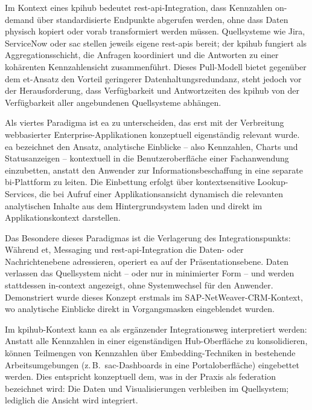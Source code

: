 Im Kontext eines \gls{kpihub} bedeutet \gls{rest}-\gls{api}-Integration, dass Kennzahlen on-demand über standardisierte Endpunkte abgerufen werden, ohne dass Daten physisch kopiert oder vorab transformiert werden müssen.
Quellsysteme wie Jira, ServiceNow oder \gls{sac} stellen jeweils eigene \gls{rest}-\glspl{api} bereit; der \gls{kpihub} fungiert als Aggregationsschicht, die Anfragen koordiniert und die Antworten zu einer kohärenten Kennzahlensicht zusammenführt.
Dieses Pull-Modell bietet gegenüber dem \gls{et}-Ansatz den Vorteil geringerer Datenhaltungsredundanz, steht jedoch vor der Herausforderung, dass Verfügbarkeit und Antwortzeiten des \gls{kpihub} von der Verfügbarkeit aller angebundenen Quellsysteme abhängen.

Als viertes Paradigma ist \gls{ea} zu unterscheiden, das erst mit der Verbreitung webbasierter Enterprise-Applikationen konzeptuell eigenständig relevant wurde.
\gls{ea} bezeichnet den Ansatz, analytische Einblicke -- also Kennzahlen, Charts und Statusanzeigen -- kontextuell in die Benutzeroberfläche einer Fachanwendung einzubetten, anstatt den Anwender zur Informationsbeschaffung in eine separate \gls{bi}-Plattform zu leiten.
Die Einbettung erfolgt über kontextsensitive Lookup-Services, die bei Aufruf einer Applikationsansicht dynamisch die relevanten analytischen Inhalte aus dem Hintergrundsystem laden und direkt im Applikationskontext darstellen.

Das Besondere dieses Paradigmas ist die Verlagerung des Integrationspunkts: Während \gls{et}, Messaging und \gls{rest}-\gls{api}-Integration die Daten- oder Nachrichtenebene adressieren, operiert \gls{ea} auf der Präsentationsebene.
Daten verlassen das Quellsystem nicht -- oder nur in minimierter Form -- und werden stattdessen in-context angezeigt, ohne Systemwechsel für den Anwender.
Demonstriert wurde dieses Konzept erstmals im SAP-NetWeaver-CRM-Kontext, wo analytische Einblicke direkt in Vorgangsmasken eingeblendet wurden.

Im \gls{kpihub}-Kontext kann \gls{ea} als ergänzender Integrationsweg interpretiert werden: Anstatt alle Kennzahlen in einer eigenständigen Hub-Oberfläche zu konsolidieren, können Teilmengen von Kennzahlen über Embedding-Techniken in bestehende Arbeitsumgebungen (z.\,B.\ \gls{sac}-Dashboards in eine Portaloberfläche) eingebettet werden.
Dies entspricht konzeptuell dem, was in der Praxis als \gls{federation} bezeichnet wird: Die Daten und Visualisierungen verbleiben im Quellsystem; lediglich die Ansicht wird integriert.

